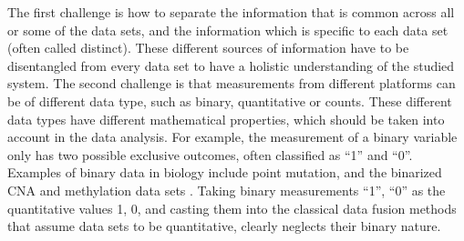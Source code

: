 The first challenge is how to separate the information that is common across all or some of the data sets, and the information which is specific to each data set (often called distinct). These different sources of information have to be disentangled from every data set to have a holistic understanding of the studied system. The second challenge is that measurements from different platforms can be of different data type, such as binary, quantitative or counts. These different data types have different mathematical properties, which should be taken into account in the data analysis. For example, the measurement of a binary variable only has two possible exclusive outcomes, often classified as ``1'' and ``0''. Examples of binary data in biology include point mutation, and the binarized CNA and methylation data sets \cite{iorio2016landscape}. Taking binary measurements ``1'', ``0'' as the quantitative values 1, 0, and casting them into the classical data fusion methods that assume data sets to be quantitative, clearly neglects their binary nature.

